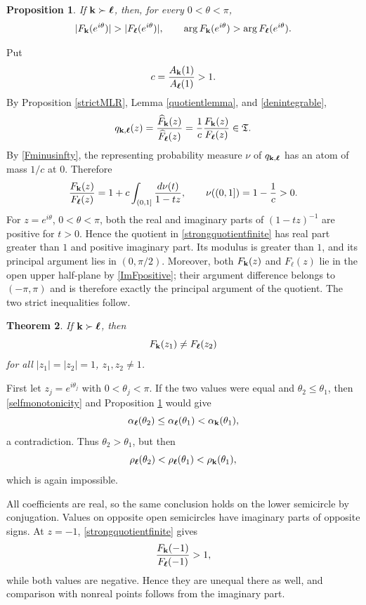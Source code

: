 \documentclass[12pt,a4paper]{amsart}
\makeatletter
\numberwithin{equation}{section}
\renewenvironment{proof}[1][Proof]{%
  \par\pushQED{\qed}%
  \normalfont\topsep6\p@\@plus6\p@\relax
  \trivlist
  \item[\hskip\labelsep\bfseries #1:]\ignorespaces
}{%
  \popQED\endtrivlist\@endpefalse
}
\theoremstyle{plain}
\newtheorem{Thm}{Theorem}[section]
\newtheorem{prop}[Thm]{Proposition}
\theoremstyle{definition}
\makeatother
\begin{document}
\begin{prop}\label{finitecross}
If ${\bf k}\succ{\boldsymbol\ell}$, then, for every $0<\theta<\pi$,
\[
|F_{\bf k}(e^{i\theta})|>|F_{\boldsymbol\ell}(e^{i\theta})|,
\qquad
\arg F_{\bf k}(e^{i\theta})>
\arg F_{\boldsymbol\ell}(e^{i\theta}).
\]
\end{prop}

\begin{proof}
Put
\[
c=\frac{A_{\bf k}(1)}{A_{\boldsymbol\ell}(1)}>1.
\]
By Proposition \ref{strictMLR}, Lemma \ref{quotientlemma}, and \eqref{denintegrable},
\begin{equation}\label{qfinite}
q_{{\bf k},{\boldsymbol\ell}}(z)
=\frac{\widehat F_{\bf k}(z)}{\widehat F_{\boldsymbol\ell}(z)}
=\frac1c\frac{F_{\bf k}(z)}{F_{\boldsymbol\ell}(z)}
\in\mathfrak{T}.
\end{equation}
By \eqref{Fminusinfty}, the representing probability measure $\nu$ of $q_{{\bf k},{\boldsymbol\ell}}$ has an atom of mass $1/c$ at $0$.  Therefore
\begin{equation}\label{strongquotientfinite}
\frac{F_{\bf k}(z)}{F_{\boldsymbol\ell}(z)}
=1+c\int_{(0,1]}\frac{d\nu(t)}{1-tz},
\qquad
\nu((0,1])=1-\frac1c>0.
\end{equation}
For $z=e^{i\theta}$, $0<\theta<\pi$, both the real and imaginary parts of $(1-tz)^{-1}$ are positive for $t>0$.  Hence the quotient in \eqref{strongquotientfinite} has real part greater than $1$ and positive imaginary part.  Its modulus is greater than $1$, and its principal argument lies in $(0,\pi/2)$.  Moreover, both $F_{\bf k}(z)$ and $F_{\boldsymbol\ell}(z)$ lie in the open upper half-plane by \eqref{ImFpositive}; their argument difference belongs to $(-\pi,\pi)$ and is therefore exactly the principal argument of the quotient.  The two strict inequalities follow.
\end{proof}

\begin{Thm}\label{finiteseparation}
If ${\bf k}\succ{\boldsymbol\ell}$, then
\[
F_{\bf k}(z_1)\neq F_{\boldsymbol\ell}(z_2)
\]
for all $|z_1|=|z_2|=1$, $z_1,z_2\neq 1$.
\end{Thm}

\begin{proof}
First let $z_j=e^{i\theta_j}$ with $0<\theta_j<\pi$.  If the two values were equal and $\theta_2\leq\theta_1$, then \eqref{selfmonotonicity} and Proposition \ref{finitecross} would give
\[
\alpha_{\boldsymbol\ell}(\theta_2)
\leq\alpha_{\boldsymbol\ell}(\theta_1)
<\alpha_{\bf k}(\theta_1),
\]
a contradiction.  Thus $\theta_2>\theta_1$, but then
\[
\rho_{\boldsymbol\ell}(\theta_2)
<\rho_{\boldsymbol\ell}(\theta_1)
<\rho_{\bf k}(\theta_1),
\]
which is again impossible.

All coefficients are real, so the same conclusion holds on the lower semicircle by conjugation.  Values on opposite open semicircles have imaginary parts of opposite signs.  At $z=-1$, \eqref{strongquotientfinite} gives
\[
\frac{F_{\bf k}(-1)}{F_{\boldsymbol\ell}(-1)}>1,
\]
while both values are negative.  Hence they are unequal there as well, and comparison with nonreal points follows from the imaginary part.
\end{proof}
\end{document}
